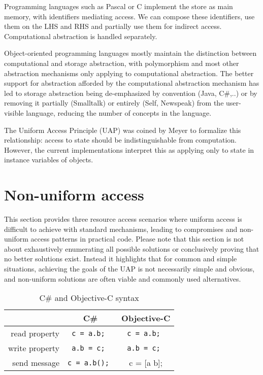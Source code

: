 \documentclass[preprint]{sigplanconf}
\begin{document}
Programming languages such as Pascal or C implement the store as main memory, with
identifiers mediating access.  We can compose these identifiers, use them on the LHS and RHS
and partially use them for indirect access.  Computational abstraction is handled separately.

Object-oriented programming languages mostly maintain the distinction between computational
and storage abstraction, with polymorphism and most other abstraction mechanisms only
applying to computational abstraction.  The better support for abstraction afforded by 
the computational abstraction mechanism has led to storage abstraction being 
de-emphasized by convention (Java, C\#,..) or by removing it partially (Smalltalk) or 
entirely (Self, Newspeak) from the user-visible language, reducing the number
of concepts in the language.  



The Uniform Access Principle (UAP) was coined by Meyer to formalize this relationship:  
access to state should be indistinguishable from computation.  However, the current
implementations interpret this as applying only to state in instance variables of objects.











\section{Non-uniform access}
\label{nonuniform}

This section provides three resource access scenarios where uniform access is difficult to achieve
with standard mechanisms, leading to compromises and non-uniform access patterns in practical
code.  Please note that this section is not about exhaustively enumerating all possible solutions
or conclusively proving that no better solutions exist. Instead it highlights that for common and
simple situations, achieving the goals of the UAP is not necessarily simple and obvious, and
non-uniform solutions are often viable and commonly used alternatives.


\begin{table}
\center
\begin{tabular}{|r|c|c|} \hline
   & C\#  	 & Objective-C  		 \\\hline 
read property 	 & {\tt c = a.b; }	 & {\tt c = a.b;  }		 \\\hline 
write property 	 & {\tt a.b = c; }	 & {\tt a.b = c; }		 \\\hline 
send message  & {\tt c = a.b();  }	 & { c =  [a b]; }		 \\\hline 
\end{tabular}
\caption{C\# and Objective-C syntax}
\label{objc-syntax}
\end{table}
\end{document}

